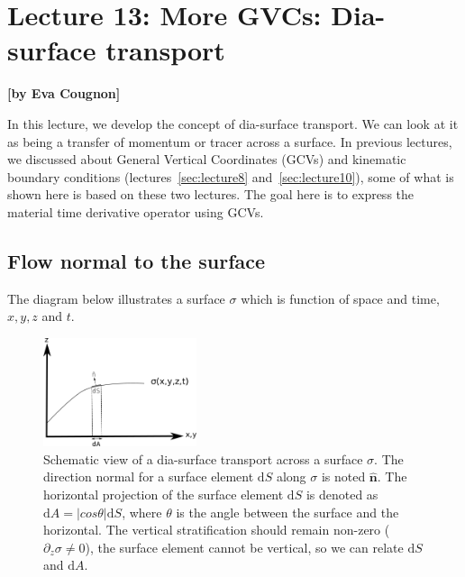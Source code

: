 
\section{Lecture 13: More GVCs: Dia-surface transport}
\begin{flushright}\textbf{[by Eva Cougnon]}\end{flushright}

In this lecture, we develop the concept of dia-surface transport. We can look at it as being a transfer of momentum or tracer across a surface. In previous lectures, we discussed about General Vertical Coordinates (GCVs) and kinematic boundary conditions (lectures~\ref{sec:lecture8} and~\ref{sec:lecture10}), some of what is shown here is based on these two lectures. The goal here is to express the material time derivative operator using GCVs.

\subsection{Flow normal to the surface}
The diagram below illustrates a surface $\sigma$ which is function of space and time, $x, y, z$ and $t$. 
\begin{figure}[h!]
\centering
\includegraphics[width=0.4\textwidth]{figures/lecture13_fig1_GVC.png}
\caption{Schematic view of a  dia-surface transport across a surface $\sigma$. The direction normal for a surface element $\mathrm{d}S$ along $\sigma$ is noted $\boldsymbol{\hat{n}}$. The horizontal projection of the surface element $\mathrm{d}S$ is denoted as $\mathrm{d}A = |cos \theta| \mathrm{d}S$, where $\theta$ is the angle between the surface and the horizontal. The vertical stratification should remain non-zero ($\partial_z\sigma\ne0$), the surface element cannot be vertical, so we can relate $\mathrm{d}S$ and $\mathrm{d}A$.
}
\label{schem1}
\end{figure}

